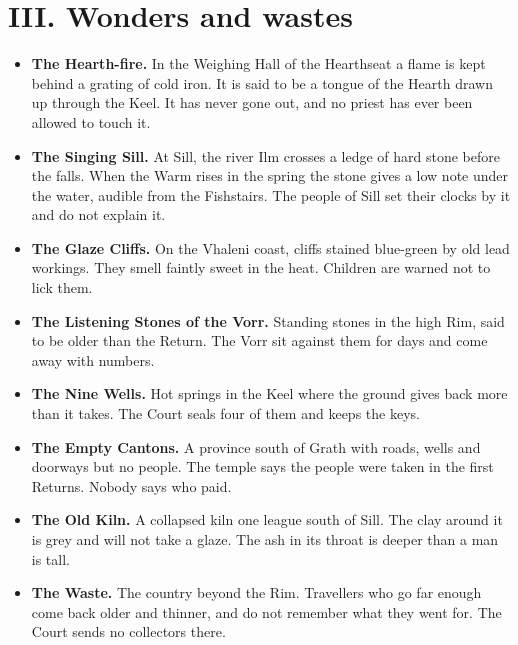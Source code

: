 \documentclass{design/chronicle}
\begin{document}
\CRrule

\section*{III. Wonders and wastes}

\begin{itemize}[leftmargin=1.4em,itemsep=1pt,topsep=3pt,parsep=0pt]

\item \textbf{The Hearth-fire.} In the Weighing Hall of the Hearthseat a flame is kept behind a grating of cold iron. It is said to be a tongue of the Hearth drawn up through the Keel. It has never gone out, and no priest has ever been allowed to touch it.

\item \textbf{The Singing Sill.} At Sill, the river Ilm crosses a ledge of hard stone before the falls. When the Warm rises in the spring the stone gives a low note under the water, audible from the Fishstairs. The people of Sill set their clocks by it and do not explain it.

\item \textbf{The Glaze Cliffs.} On the Vhaleni coast, cliffs stained blue-green by old lead workings. They smell faintly sweet in the heat. Children are warned not to lick them.

\item \textbf{The Listening Stones of the Vorr.} Standing stones in the high Rim, said to be older than the Return. The Vorr sit against them for days and come away with numbers.

\item \textbf{The Nine Wells.} Hot springs in the Keel where the ground gives back more than it takes. The Court seals four of them and keeps the keys.

\item \textbf{The Empty Cantons.} A province south of Grath with roads, wells and doorways but no people. The temple says the people were taken in the first Returns. Nobody says who paid.

\item \textbf{The Old Kiln.} A collapsed kiln one league south of Sill. The clay around it is grey and will not take a glaze. The ash in its throat is deeper than a man is tall.

\item \textbf{The Waste.} The country beyond the Rim. Travellers who go far enough come back older and thinner, and do not remember what they went for. The Court sends no collectors there.

\end{itemize}
\end{document}
